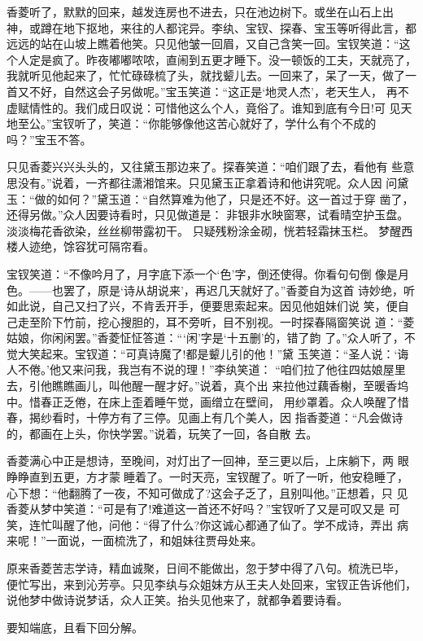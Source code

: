 香菱听了，默默的回来，越发连房也不进去，只在池边树下。或坐在山石上出
神，或蹲在地下抠地，来往的人都诧异。李纨、宝钗、探春、宝玉等听得此言，都
远远的站在山坡上瞧着他笑。只见他皱一回眉，又自己含笑一回。宝钗笑道：“这
个人定是疯了。昨夜嘟嘟哝哝，直闹到五更才睡下。没一顿饭的工夫，天就亮了，
我就听见他起来了，忙忙碌碌梳了头，就找颦儿去。一回来了，呆了一天，做了一
首又不好，自然这会子另做呢。”宝玉笑道：“这正是‘地灵人杰’，老天生人，
再不虚赋情性的。我们成日叹说：可惜他这么个人，竟俗了。谁知到底有今日!可
见天地至公。”宝钗听了，笑道：“你能够像他这苦心就好了，学什么有个不成的
吗？”宝玉不答。

只见香菱兴兴头头的，又往黛玉那边来了。探春笑道：“咱们跟了去，看他有
些意思没有。”说着，一齐都往潇湘馆来。只见黛玉正拿着诗和他讲究呢。众人因
问黛玉：“做的如何？”黛玉道：“自然算难为他了，只是还不好。这一首过于穿
凿了，还得另做。”众人因要诗看时，只见做道是：
非银非水映窗寒，试看晴空护玉盘。
淡淡梅花香欲染，丝丝柳带露初干。
只疑残粉涂金砌，恍若轻霜抹玉栏。
梦醒西楼人迹绝，馀容犹可隔帘看。

宝钗笑道：“不像吟月了，月字底下添一个‘色’字，倒还使得。你看句句倒
像是月色。——也罢了，原是‘诗从胡说来’，再迟几天就好了。”香菱自为这首
诗妙绝，听如此说，自己又扫了兴，不肯丢开手，便要思索起来。因见他姐妹们说
笑，便自己走至阶下竹前，挖心搜胆的，耳不旁听，目不别视。一时探春隔窗笑说
道：“菱姑娘，你闲闲罢。”香菱怔怔答道：“‘闲’字是‘十五删’的，错了韵
了。”众人听了，不觉大笑起来。宝钗道：“可真诗魔了!都是颦儿引的他！”黛
玉笑道：“圣人说：‘诲人不倦。’他又来问我，我岂有不说的理！”李纨笑道：
“咱们拉了他往四姑娘屋里去，引他瞧瞧画儿，叫他醒一醒才好。”说着，真个出
来拉他过藕香榭，至暖香坞中。惜春正乏倦，在床上歪着睡午觉，画缯立在壁间，
用纱罩着。众人唤醒了惜春，揭纱看时，十停方有了三停。见画上有几个美人，因
指香菱道：“凡会做诗的，都画在上头，你快学罢。”说着，玩笑了一回，各自散
去。

香菱满心中正是想诗，至晚间，对灯出了一回神，至三更以后，上床躺下，两
眼睁睁直到五更，方才蒙睡着了。一时天亮，宝钗醒了。听了一听，他安稳睡了，
心下想：“他翻腾了一夜，不知可做成了?这会子乏了，且别叫他。”正想着，只
见香菱从梦中笑道：“可是有了!难道这一首还不好吗？”宝钗听了又是可叹又是
可笑，连忙叫醒了他，问他：“得了什么?你这诚心都通了仙了。学不成诗，弄出
病来呢！”一面说，一面梳洗了，和姐妹往贾母处来。

原来香菱苦志学诗，精血诚聚，日间不能做出，忽于梦中得了八句。梳洗已毕，
便忙写出，来到沁芳亭。只见李纨与众姐妹方从王夫人处回来，宝钗正告诉他们，
说他梦中做诗说梦话，众人正笑。抬头见他来了，就都争着要诗看。

要知端底，且看下回分解。